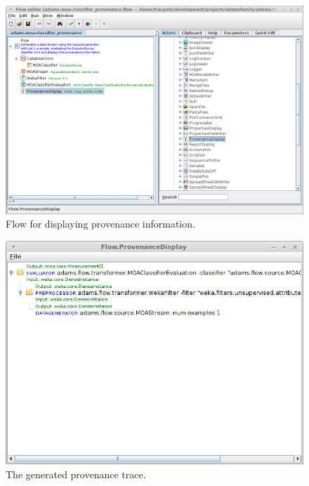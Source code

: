 \documentclass[a4paper]{book}
\begin{document}
\begin{figure}[htb]
  \centering
  \includegraphics[width=12.0cm]{images/provenance-flow.png}
  \caption{Flow for displaying provenance information.}
  \label{provenance-flow}
\end{figure}

\begin{figure}[htb]
  \centering
  \includegraphics[width=12.0cm]{images/provenance-output.png}
  \caption{The generated provenance trace.}
  \label{provenance-output}
\end{figure}
\end{document}
